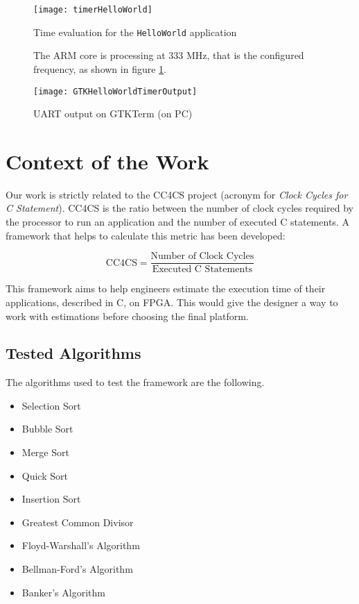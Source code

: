 \begin{figure}[htbp]
	\centering
	\texttt{[image: timerHelloWorld]}
	\caption{Time evaluation for the \texttt{HelloWorld} application}
	\label{fig:helloworldtimer}
	
	\bigskip
	\noindent
	\begin{flushleft}
		The ARM core is processing at 333 MHz, that is the configured frequency, as shown in figure \ref{fig:helloworldtimeroutput}.
	\end{flushleft}
	\bigskip
	
	\centering
	\texttt{[image: GTKHelloWorldTimerOutput]}
	\caption{UART output on GTKTerm (on PC)}
	\label{fig:helloworldtimeroutput}
\end{figure}

\section{Context of the Work}
Our work is strictly related to the CC4CS project\cite{cc4cs_git} (acronym for \textit{Clock Cycles for C Statement}). CC4CS is the ratio between the number of clock cycles required by the processor to run an application and the number of executed C statements. A framework that helps to calculate this metric has been developed:

\[
\text{CC4CS} = \frac{\text{Number of Clock Cycles}}{\text{Executed C Statements}}
\]

This framework aims to help engineers estimate the execution time of their applications, described in C, on FPGA. This would give the designer a way to work with estimations before choosing the final platform.

\subsection{Tested Algorithms}
\label{tested-algo}

The algorithms used to test the framework are the following.

\begin{itemize}[noitemsep]
	\item Selection Sort
	\item Bubble Sort
	\item Merge Sort
	\item Quick Sort
	\item Insertion Sort
	\item Greatest Common Divisor
	\item Floyd-Warshall's Algorithm
	\item Bellman-Ford's Algorithm
	\item Banker's Algorithm

\end{itemize}

